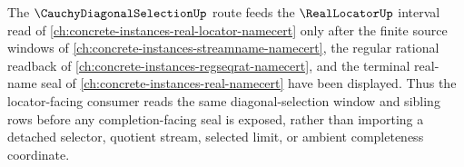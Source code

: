 The $\CauchyDiagonalSelectionUp$ route feeds the $\RealLocatorUp$ interval read of \autoref{ch:concrete-instances-real-locator-namecert} only after the finite source windows of \autoref{ch:concrete-instances-streamname-namecert}, the regular rational readback of \autoref{ch:concrete-instances-regseqrat-namecert}, and the terminal real-name seal of \autoref{ch:concrete-instances-real-namecert} have been displayed. Thus the locator-facing consumer reads the same diagonal-selection window and sibling rows before any completion-facing seal is exposed, rather than importing a detached selector, quotient stream, selected limit, or ambient completeness coordinate.
